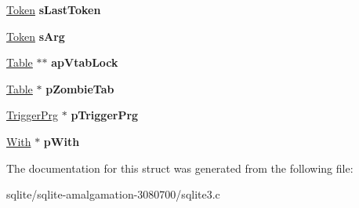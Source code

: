 \begin{DoxyCompactItemize}
\item 
\hypertarget{struct_parse_ad499020d1bf06f3c98c8d36e2ceb83fd}{\hyperlink{struct_token}{Token} {\bfseries s\+Last\+Token}}\label{struct_parse_ad499020d1bf06f3c98c8d36e2ceb83fd}

\item 
\hypertarget{struct_parse_aa3fe38b31dd1cd0fbea4de0e77891642}{\hyperlink{struct_token}{Token} {\bfseries s\+Arg}}\label{struct_parse_aa3fe38b31dd1cd0fbea4de0e77891642}

\item 
\hypertarget{struct_parse_acdfd318c0f04ec640d6affc85ef8a009}{\hyperlink{struct_table}{Table} $\ast$$\ast$ {\bfseries ap\+Vtab\+Lock}}\label{struct_parse_acdfd318c0f04ec640d6affc85ef8a009}

\item 
\hypertarget{struct_parse_a4e8319f0a7f0d21e472c13ac6cf67060}{\hyperlink{struct_table}{Table} $\ast$ {\bfseries p\+Zombie\+Tab}}\label{struct_parse_a4e8319f0a7f0d21e472c13ac6cf67060}

\item 
\hypertarget{struct_parse_a0891dbd3b583594c5d07d7b061026ea4}{\hyperlink{struct_trigger_prg}{Trigger\+Prg} $\ast$ {\bfseries p\+Trigger\+Prg}}\label{struct_parse_a0891dbd3b583594c5d07d7b061026ea4}

\item 
\hypertarget{struct_parse_a7a812b036ddcc4b838b956328e1ff03e}{\hyperlink{struct_with}{With} $\ast$ {\bfseries p\+With}}\label{struct_parse_a7a812b036ddcc4b838b956328e1ff03e}

\end{DoxyCompactItemize}


The documentation for this struct was generated from the following file\+:\begin{DoxyCompactItemize}
\item 
sqlite/sqlite-\/amalgamation-\/3080700/sqlite3.\+c\end{DoxyCompactItemize}
